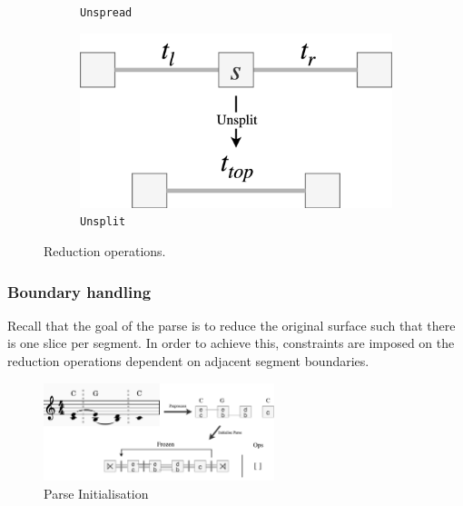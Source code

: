 \documentclass[12pt,a4paper,twoside,openright]{report}
\theoremstyle{definition}
\begin{document}
\begin{figure}[h]
\begin{subfigure}[t]{.43\textwidth}
    \caption{\texttt{Unspread}}
    \label{fig:spreadOP}
  \end{subfigure}
  \begin{subfigure}[t]{.3\textwidth}
    \centering\includegraphics[keepaspectratio,width=\textwidth]{impl/eval/unsplit.png}
    \caption{\texttt{Unsplit}}
    \label{fig:freezeOp}
  \end{subfigure}

  \captionsetup{width=.9\linewidth}
  \caption{Reduction operations.}
  \label{fig:evalOps}
\end{figure}

%
%
%
%
%
%

\subsubsection{Boundary handling}

Recall that the goal of the parse is to reduce the original surface such that there is one slice per segment. 
In order to achieve this, constraints are imposed on the reduction operations dependent on adjacent segment boundaries. 

\begin{figure}[h]
  \centering
  \includegraphics[width=0.6\textwidth]{impl/parseInit.png}
  \caption{Parse Initialisation}
  \label{fig:parseInit}
\end{figure}
\end{document}
